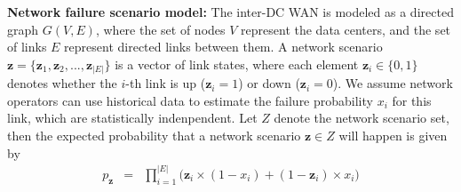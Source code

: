 \documentclass[sigconf]{acmart}
\begin{document}
\textbf{Network failure scenario model:} 
The inter-DC WAN is modeled as a directed graph $G(V,E)$, where the set of nodes $V$ represent the data centers, 
and the set of links $E$ represent directed links between them. 
A network scenario $\mathbf{z}=\{\mathbf{z}_1,\mathbf{z}_2,...,\mathbf{z}_{|E|}\}$ is a vector of link states, 
where each element $\mathbf{z}_i \in \{0,1\}$ denotes whether the $i$-th link is up ($\mathbf{z}_i=1$) or down ($\mathbf{z}_i=0$). 
We assume network operators can use historical data to estimate the failure probability $x_i$ for this link, which are statistically indenpendent. 
Let $Z$ denote the network scenario set, %
then the expected probability that a network scenario  $\mathbf{z} \in Z$ will happen is given by \cite{Teavar} 
\begin{eqnarray*} \label{state}
p_{\mathbf{z}}&=&\prod_{i=1}^{|E|}\big(\mathbf{z}_i \times (1-x_i)+ (1-\mathbf{z}_i) \times x_i\big)
\end{eqnarray*}
\end{document}
